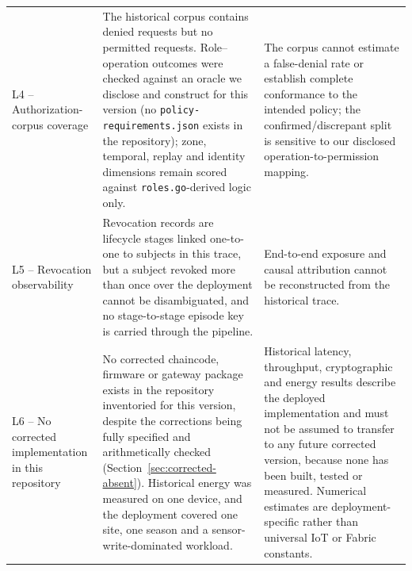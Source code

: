\begin{center}
\begin{longtable}{p{2.0cm}p{5.0cm}p{5.6cm}}
L4 -- Authorization-corpus coverage & The historical corpus contains denied requests but no permitted requests. Role--operation outcomes were checked against an oracle we disclose and construct for this version (no \texttt{policy-requirements.json} exists in the repository); zone, temporal, replay and identity dimensions remain scored against \texttt{roles.go}-derived logic only. & The corpus cannot estimate a false-denial rate or establish complete conformance to the intended policy; the confirmed/discrepant split is sensitive to our disclosed operation-to-permission mapping. \\
L5 -- Revocation observability & Revocation records are lifecycle stages linked one-to-one to subjects in this trace, but a subject revoked more than once over the deployment cannot be disambiguated, and no stage-to-stage episode key is carried through the pipeline. & End-to-end exposure and causal attribution cannot be reconstructed from the historical trace. \\
L6 -- No corrected implementation in this repository & No corrected chaincode, firmware or gateway package exists in the repository inventoried for this version, despite the corrections being fully specified and arithmetically checked (Section~\ref{sec:corrected-absent}). Historical energy was measured on one device, and the deployment covered one site, one season and a sensor-write-dominated workload. & Historical latency, throughput, cryptographic and energy results describe the deployed implementation and must not be assumed to transfer to any future corrected version, because none has been built, tested or measured. Numerical estimates are deployment-specific rather than universal IoT or Fabric constants. \\
\end{longtable}
\end{center}
